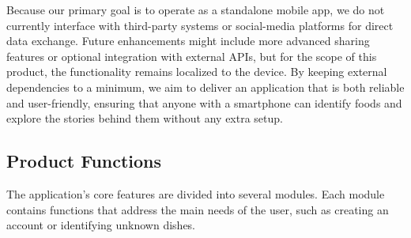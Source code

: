 \documentclass[]{article}
\begin{document}
Because our primary goal is to operate as a standalone mobile app, we do not currently interface with third-party systems or social-media platforms for direct data exchange. Future enhancements might include more advanced sharing features or optional integration with external APIs, but for the scope of this product, the functionality remains localized to the device. By keeping external dependencies to a minimum, we aim to deliver an application that is both reliable and user-friendly, ensuring that anyone with a smartphone can identify foods and explore the stories behind them without any extra setup.

\subsection{Product Functions}
\label{sub:product_functions}

The application's core features are divided into several modules. Each module contains functions that address the main needs of the user, such as creating an account or identifying unknown dishes.
\end{document}
